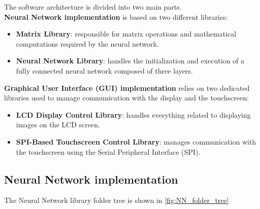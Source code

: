 The software architecture is divided into two main parts. \\
\textbf{Neural Network implementation} is based on two different libraries:

\begin{itemize}

    \setlength\itemsep{0pt}
    \setlength\parskip{0pt}
    
    \item \textbf{Matrix Library}: responsible for matrix operations and mathematical computations required by the neural network.
    
    \item \textbf{Neural Network Library}: handles the initialization and execution of a fully connected neural network composed of three layers.
\end{itemize}

\noindent
\textbf{Graphical User Interface (GUI) implementation} relies on two dedicated libraries used to manage communication with the display and the touchscreen:

\begin{itemize}

    \setlength\itemsep{0pt}
    \setlength\parskip{0pt}
    
    \item \textbf{LCD Display Control Library}: handles everything related to displaying images on the LCD screen.
    
    \item \textbf{SPI-Based Touchscreen Control Library}: manages communication with the touchscreen using the Serial Peripheral Interface (SPI).
\end{itemize}

\subsection{Neural Network implementation}

The Neural Network library folder tree is shown in \autoref{fig:NN_folder_tree}

